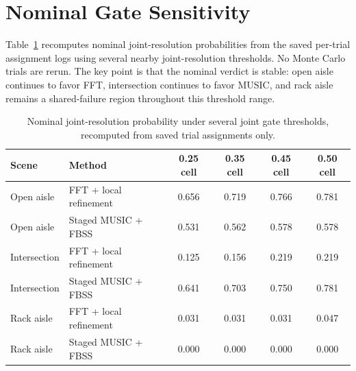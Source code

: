 \documentclass[11pt]{article}
\begin{document}
\section{Nominal Gate Sensitivity}
\label{app:gate-sensitivity}

Table~\ref{tab:gate-sensitivity} recomputes nominal joint-resolution probabilities from the saved per-trial assignment logs using several nearby joint-resolution thresholds. No Monte Carlo trials are rerun. The key point is that the nominal verdict is stable: open aisle continues to favor FFT, intersection continues to favor MUSIC, and rack aisle remains a shared-failure region throughout this threshold range.

\begin{table}[H]
\centering
\small
\caption{Nominal joint-resolution probability under several joint gate thresholds, recomputed from saved trial assignments only.}
\label{tab:gate-sensitivity}
\begin{tabular}{llcccc}
\toprule
Scene & Method & 0.25 cell & 0.35 cell & 0.45 cell & 0.50 cell \\
\midrule
Open aisle & FFT + local refinement & 0.656 & 0.719 & 0.766 & 0.781 \\
Open aisle & Staged MUSIC + FBSS & 0.531 & 0.562 & 0.578 & 0.578 \\
Intersection & FFT + local refinement & 0.125 & 0.156 & 0.219 & 0.219 \\
Intersection & Staged MUSIC + FBSS & 0.641 & 0.703 & 0.750 & 0.781 \\
Rack aisle & FFT + local refinement & 0.031 & 0.031 & 0.031 & 0.047 \\
Rack aisle & Staged MUSIC + FBSS & 0.000 & 0.000 & 0.000 & 0.000 \\
\bottomrule
\end{tabular}
\end{table}
\end{document}
